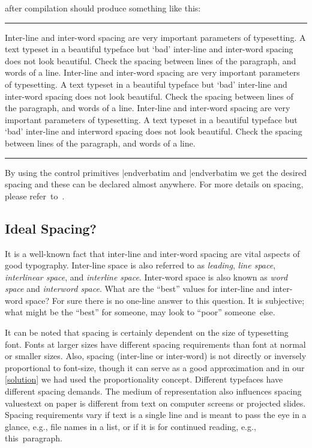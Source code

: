 {\nopagebreak\ii after compilation should produce something like this:\nopagebreak


\bigskip\hrule\vbox{\noindent\vrule\NoBlackBoxes\vbox{\vskip2mm
{\parindent=0pt
\fontspacing %
Inter-line and inter-word spacing are very important parameters of
typesetting. A text typeset in a beautiful typeface but `bad'
inter-line and inter-word spacing does not look beautiful. Check
the spacing between lines of the paragraph, and words of a line.
\medskip
\sixrm %
\fontspacing %
Inter-line and inter-word spacing are very important parameters of
typesetting. A text typeset in a beautiful typeface but `bad'
inter-line and inter-word spacing does not look beautiful. Check
the spacing between lines of the paragraph, and words of a line.
\medskip
\eighteenrm %
\fontspacing %
Inter-line and inter-word spacing are very important parameters of
typesetting. A text typeset in a beautiful typeface but `bad'
inter-line and inter\-word spacing does not look beautiful. Check
the spacing between lines of the paragraph, and words of a line.}
\vskip2mm}\vrule}\hrule\BlackBoxes\bigskip\bigskip

By using the control primitives {\color{brown}\verbatim \spaceskip|endverbatim} and {\color{brown}\verbatim \baselineskip|endverbatim} we get the desired spacing and these can be declared almost anywhere. For more details on spacing, please refer~to~\cite{knuth_texbook}.


\subsection{Ideal Spacing?}It is a well-known fact that inter-line and inter-word spacing are vital aspects of good typography. Inter-line space is also referred to as {\sl leading}, {\sl line space}, {\sl interlinear space}, and {\sl interline space}. Inter-word space is also known as {\sl word space} and {\sl interword space}. What are the ``best'' values for inter-line and inter-word space? For sure there is no one-line answer to this question. It is subjective; what might be the ``best'' for someone, may look to ``poor'' someone~else.

It can be noted that spacing is certainly dependent on the size of typesetting font. Fonts at larger sizes have different spacing requirements than font at normal or smaller sizes. Also, spacing (inter-line or inter-word) is not directly or inversely proportional to font-size, though it can serve as a good approximation and in our \ref{solution} we had used the proportionality concept. Different typefaces have different spacing demands. The medium of representation also influences spacing values\emdash text on paper is different from text on computer screens or projected slides. Spacing requirements vary if text is a single line and is meant to pass the eye in a glance, e.g., file names in a list, or if it is for continued reading, e.g., this~paragraph.

}
